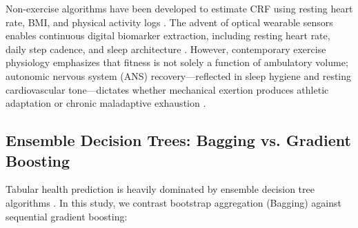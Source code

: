 \documentclass[11pt,a4paper]{article}
\begin{document}
Non-exercise algorithms have been developed to estimate CRF using resting heart rate, BMI, and physical activity logs \citep{jackson1990}. The advent of optical wearable sensors enables continuous digital biomarker extraction, including resting heart rate, daily step cadence, and sleep architecture \citep{smuck2021}. However, contemporary exercise physiology emphasizes that fitness is not solely a function of ambulatory volume; autonomic nervous system (ANS) recovery---reflected in sleep hygiene and resting cardiovascular tone---dictates whether mechanical exertion produces athletic adaptation or chronic maladaptive exhaustion \citep{mandsager2018}.

\subsection{Ensemble Decision Trees: Bagging vs. Gradient Boosting}
Tabular health prediction is heavily dominated by ensemble decision tree algorithms \citep{borisov2022}. In this study, we contrast bootstrap aggregation (Bagging) against sequential gradient boosting:
\end{document}
